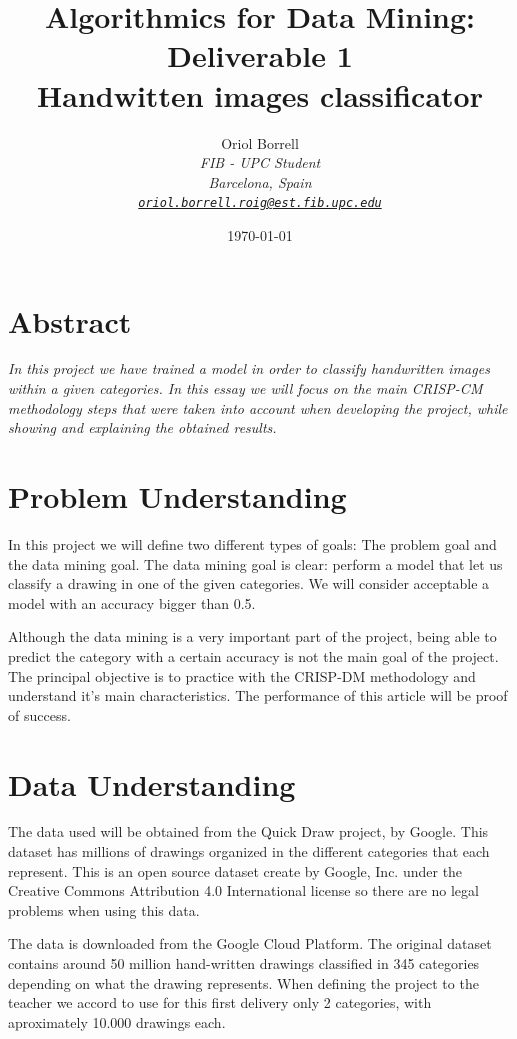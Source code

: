 \documentclass{article}
\title{
\textbf{Algorithmics for Data Mining: Deliverable 1\\} \Large{
    Handwitten images classificator}}
\author{Oriol Borrell\\
\textit{\small FIB - UPC Student} \\
\textit{\small Barcelona, Spain} \\
\textit{\texttt{\href{mailto:oriol.borrell.roig@est.fib.upc.edu}
{\small oriol.borrell.roig@est.fib.upc.edu}}}}
\date{\today}
\begin{document}
\maketitle

\section{Abstract}
\textit{
In this project we have trained a model\cite{CODE} in order to classify handwritten images within a given categories. In this essay we will focus on the main CRISP-CM methodology steps that were taken into account when developing the project, while showing and explaining the obtained results.
}

\section{Problem Understanding}
In this project we will define two different types of goals: The problem goal and the data mining goal. The data mining goal is clear: perform a model that let us classify a drawing in one of the given categories. We will consider acceptable a model with an accuracy bigger than 0.5.

Although the data mining is a very important part of the project, being able to predict the category with a certain accuracy is not the main goal of the project. The principal objective is to practice with the CRISP-DM methodology and understand it's main characteristics. The performance of this article will be proof of success.

\section{Data Understanding}
The data used will be obtained from the Quick Draw\cite{QDP} project, by Google. This dataset has millions of drawings organized in the different categories that each represent. This is an open source dataset create by Google, Inc. under the Creative Commons Attribution 4.0 International license\cite{QDL} so there are no legal problems when using this data.

The data is downloaded from the Google Cloud Platform\cite{GCP}. The original dataset contains around 50 million hand-written drawings classified in 345 categories depending on what the drawing represents. When defining the project to the teacher we accord to use for this first delivery only 2 categories, with aproximately 10.000 drawings each.
\end{document}
